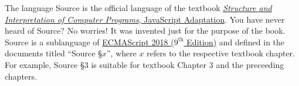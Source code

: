 The language Source is the official language of the textbook
\href{https://www.comp.nus.edu.sg/~cs1101s/sicp}{\color{DarkBlue}\emph{Structure and Interpretation
of Computer Programs}, JavaScript Adaptation}.
You have never heard of Source? No worries! It was invented
just for the purpose of the book. Source is a sublanguage of 
\href{http://www.ecma-international.org/publications/files/ECMA-ST/Ecma-262.pdf}{\color{DarkBlue}
ECMAScript 2018 ($9^{\textrm{th}}$ Edition)} 
and defined in the documents titled ``Source \S $x$'', where $x$ refers to the
respective textbook chapter. For example, Source \S 3 is suitable for textbook Chapter 3
and the preceeding chapters.
